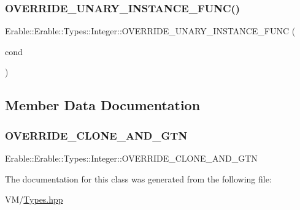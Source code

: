 \subsubsection{\texorpdfstring{OVERRIDE\_UNARY\_INSTANCE\_FUNC()}{OVERRIDE\_UNARY\_INSTANCE\_FUNC()}}
{\footnotesize\ttfamily Erable\+::\+Erable\+::\+Types\+::\+Integer\+::\+O\+V\+E\+R\+R\+I\+D\+E\+\_\+\+U\+N\+A\+R\+Y\+\_\+\+I\+N\+S\+T\+A\+N\+C\+E\+\_\+\+F\+U\+NC (\begin{DoxyParamCaption}\item[{cond}]{ }\end{DoxyParamCaption})}



\subsection{Member Data Documentation}
\mbox{\label{class_erable_1_1_erable_1_1_types_1_1_integer_a42b591edd7b42ff1dbeb9e174c7c332f}} 
\subsubsection{\texorpdfstring{OVERRIDE\_CLONE\_AND\_GTN}{OVERRIDE\_CLONE\_AND\_GTN}}
{\footnotesize\ttfamily Erable\+::\+Erable\+::\+Types\+::\+Integer\+::\+O\+V\+E\+R\+R\+I\+D\+E\+\_\+\+C\+L\+O\+N\+E\+\_\+\+A\+N\+D\+\_\+\+G\+TN}



The documentation for this class was generated from the following file\+:\begin{DoxyCompactItemize}
\item 
V\+M/\mbox{\hyperlink{_types_8hpp}{Types.\+hpp}}\end{DoxyCompactItemize}
